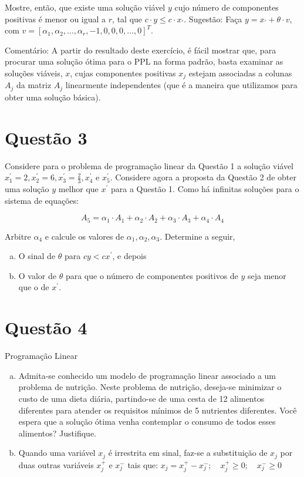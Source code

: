 \documentclass{article}
\begin{document}
Mostre, então, que existe uma solução viável $y$ cujo número de componentes positivas é menor ou igual a $r$, tal que $c \cdot y \leq c \cdot x_{\prime}$.
Sugestão: Faça $y = x_{\prime} + \theta \cdot v$, com $v = \left[ \alpha_{1}, \alpha_{2}, \dots, \alpha_{r}, -1, 0, 0, 0, \dots, 0 \right]^{T}$.

Comentário: A partir do resultado deste exercício, é fácil mostrar que, para procurar uma solução ótima para o PPL na forma padrão, basta examinar as soluções viáveis, $x$, cujas componentes positivas $x_j$ estejam associadas a colunas $A_j$ da matriz $A_j$ linearmente independentes (que é a maneira que utilizamos para obter uma solução básica).

\section{Questão 3}

Considere para o problema de programação linear da Questão 1 a solução viável   
$x_{1}^{\prime} = 2, x_{2}^{\prime} = 6, x_{3}^{\prime} = \frac{2}{3}, x_{4}^{\prime}$ e $x_{5}^{\prime}$.
Considere agora a proposta da Questão 2 de obter uma solução $y$ melhor que $x^{\prime}$ para a Questão 1.
Como há infinitas soluções para o sistema de equações:

\[
  A_5 = \alpha_1 \cdot A_1 + \alpha_2 \cdot A_2 + \alpha_3 \cdot A_3 + \alpha_4 \cdot A_4
\]

Arbitre $\alpha_4$ e calcule os valores de $\alpha_1, \alpha_2, \alpha_3$.
Determine a seguir,

\begin{enumerate}[(a)]
    \item O sinal de $\theta$ para $cy< cx^{\prime}$, e depois
    \item O valor de $\theta$ para que o número de componentes positivos de $y$ seja menor que o de $x^{\prime}$.
\end{enumerate}

\section{Questão 4}

Programação Linear 

\begin{enumerate}[(a)]
  \item Admita-se conhecido um modelo de programação linear associado a um problema de nutrição. Neste problema de nutrição, deseja-se minimizar o custo de uma dieta diária, partindo-se de uma cesta de 12 alimentos diferentes para atender os requisitos mínimos de 5 nutrientes diferentes. Você espera que a solução ótima venha contemplar o consumo de todos esses alimentos? Justifique.
  \item Quando uma variável $x_j$ é irrestrita em sinal, faz-se a substituição de $x_j$ por duas outras variáveis $x_{j}^{+}$ e $x_{j}^{-}$ tais que: $x_j = x_{j}^{+} - x_{j}^{-}; \quad x_{j}^{+} \geq 0 ; \quad x_{j}^{-} \geq 0$
\end{enumerate}
 
\end{document}
